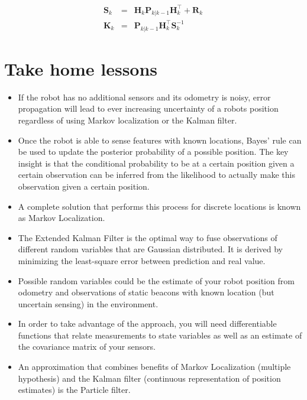 \begin{eqnarray}
\boldsymbol{S}_{k}&=&{\boldsymbol{H}_{k}}\boldsymbol{P}_{k|k-1}{\boldsymbol{H}_{k}^\top}+\boldsymbol{R}_{k}\\
\boldsymbol{K}_{k}&=&\boldsymbol{P}_{k|k-1}{\boldsymbol{H}_{k}^\top}\boldsymbol{S}_{k}^{-1}
\end{eqnarray}

\section*{Take home lessons}
\begin{itemize}
\item If the robot has no additional sensors and its odometry is noisy, error propagation will lead to ever increasing uncertainty of a robots position regardless of using Markov localization or the Kalman filter.
\item Once the robot is able to sense features with known locations, Bayes' rule can be used to update the posterior probability of a possible position. The key insight is that the conditional probability to be at a certain position given a certain observation can be inferred from the likelihood to actually make this observation given a certain position.
\item A complete solution that performs this process for discrete locations is known as Markov Localization. 
\item The Extended Kalman Filter is the optimal way to fuse observations of different random variables that are Gaussian distributed.
It is derived by minimizing the least-square error between prediction and real value.
\item Possible random variables could be the estimate of your robot position from odometry and observations of static beacons with known location (but uncertain sensing) in the environment.
\item In order to take advantage of the approach, you will need differentiable functions that relate measurements to state variables as well as an estimate of the covariance matrix of your sensors.
\item An approximation that combines benefits of Markov Localization (multiple hypothesis) and the Kalman filter (continuous representation of position estimates) is the Particle filter.
\end{itemize}

